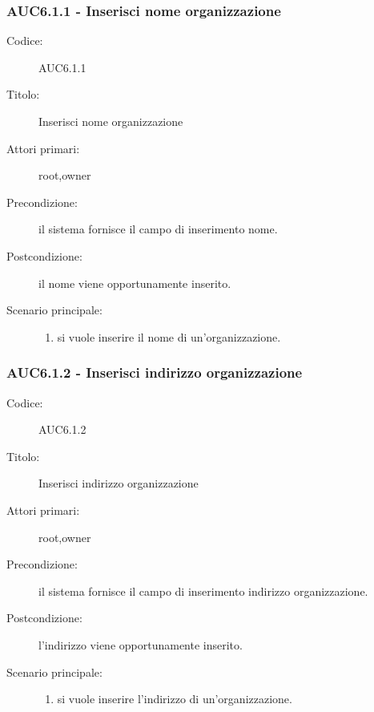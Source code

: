 \documentclass[casi-duso]{subfiles}
\begin{document}
  \subsubsection{AUC6.1.1 - Inserisci nome organizzazione}%
  \label{subsub:AUC6.1.1}
  \begin{description}
    \item[Codice:] AUC6.1.1
    \item[Titolo:] Inserisci nome organizzazione
    \item[Attori primari:] root,owner
    \item[Precondizione:] il sistema fornisce il campo di inserimento nome.
    \item[Postcondizione:] il nome viene opportunamente inserito.
    \item[Scenario principale:]
    \begin{enumerate}
      \item si vuole inserire il nome di un'organizzazione.
    \end{enumerate}

  \end{description}

  \subsubsection{AUC6.1.2 - Inserisci indirizzo organizzazione}%
  \label{subsub:AUC6.1.2}
  \begin{description}
    \item[Codice:] AUC6.1.2
    \item[Titolo:] Inserisci indirizzo organizzazione
    \item[Attori primari:] root,owner
    \item[Precondizione:] il sistema fornisce il campo di inserimento indirizzo organizzazione.
    \item[Postcondizione:] l'indirizzo viene opportunamente inserito.
    \item[Scenario principale:]
    \begin{enumerate}
      \item si vuole inserire l'indirizzo di un'organizzazione.
    \end{enumerate}
  \end{description}
\end{document}

